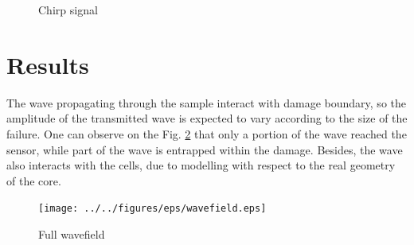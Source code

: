 \documentclass[materials,article,submit,moreauthors,pdftex]{Definitions/mdpi}
\begin{document}
{\begin{figure}
\begin{center}
	\end{center}
	\caption{Chirp signal}
	\label{fig:chirp}
\end{figure}
\section{Results}
\label{sec:results}
The wave propagating through the sample interact with damage boundary, so the amplitude of the transmitted wave is expected to vary according to the size of the failure.
One can observe on the Fig. \ref{fig:wavefield} that only a portion of the wave reached the sensor, while part of the wave is entrapped within the damage.
Besides, the wave also interacts with the cells, due to modelling with respect to the real geometry of the core.
\begin{figure}
	\begin{center}
		\texttt{[image: ../../figures/eps/wavefield.eps]}
	\end{center}
	\caption{Full wavefield}
	\label{fig:wavefield}
\end{figure}

}
\end{document}
